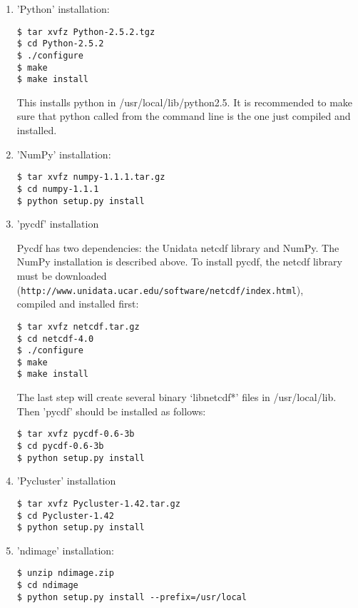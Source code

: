 \begin{enumerate}

\item 'Python' installation:

\begin{verbatim}
$ tar xvfz Python-2.5.2.tgz
$ cd Python-2.5.2
$ ./configure
$ make
$ make install
\end{verbatim}

\noindent
This installs python in /usr/local/lib/python2.5. It is recommended
to make sure that python called from the command line is the one
just compiled and installed.

\item 'NumPy' installation:

\begin{verbatim}
$ tar xvfz numpy-1.1.1.tar.gz
$ cd numpy-1.1.1
$ python setup.py install
\end{verbatim}

\item 'pycdf' installation

Pycdf has two dependencies: the Unidata netcdf library and NumPy. The
NumPy installation is described above. To install pycdf, the netcdf
library must be downloaded\\
({\tt http://www.unidata.ucar.edu/software/netcdf/index.html}),\\
compiled and installed first:

\begin{verbatim}
$ tar xvfz netcdf.tar.gz
$ cd netcdf-4.0
$ ./configure
$ make
$ make install
\end{verbatim}

The last step will create several binary `libnetcdf*' files in
/usr/local/lib. Then 'pycdf' should be installed as follows:

\begin{verbatim}
$ tar xvfz pycdf-0.6-3b
$ cd pycdf-0.6-3b
$ python setup.py install
\end{verbatim}

\item 'Pycluster' installation

\begin{verbatim}
$ tar xvfz Pycluster-1.42.tar.gz
$ cd Pycluster-1.42
$ python setup.py install
\end{verbatim}

\item 'ndimage' installation:

\begin{verbatim}
$ unzip ndimage.zip
$ cd ndimage
$ python setup.py install --prefix=/usr/local
\end{verbatim}


\end{enumerate}
